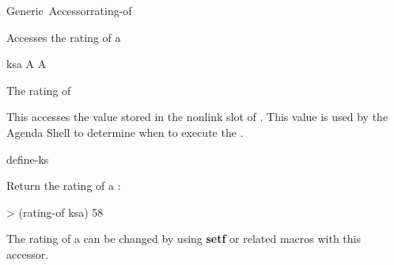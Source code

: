 \documentclass[10pt,twoside,english,pdftex]{article}
\begin{document}
\begin{functiondoc}{Generic~Accessor}{rating-of}{ 
    \returns{} }
%

\fnsyntax

\fnpurpose Accesses the rating of a 

\fnsetf
{}

\fnmethods
{}

\fnpackage {}

\fnmodule {}

\fnargs
\begin{args}{ksa}
\arg[ksa] A 
\arg[rating] A 
\end{args}

\fnreturns The rating of 
  
\fndescription 
This  accesses the value stored in the
 nonlink slot of .  This value is used by the
Agenda Shell to determine when to execute the .

\begin{alsos}{define-ks}
\also[define-ks]
\also[ks]
\also[ksa]
\end{alsos}

\fnexample
Return the rating of a :
\begin{example}
> (rating-of ksa)
58
\end{example}

\fnnotes 
The rating of a  can be changed by using {\bf setf} or
related macros with this accessor.

\end{functiondoc}

\end{document}
